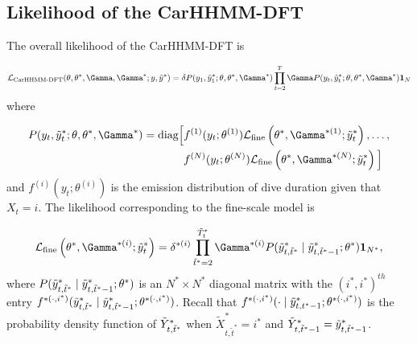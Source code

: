 
\subsection{Likelihood of the CarHHMM-DFT}

The overall likelihood of the CarHHMM-DFT is

\[\calL_{\text{CarHHMM-DFT}}(\theta,\theta^*,\Gamma,\Gamma^*;y,\z) = \delta P(y_1,\z_1;\theta,\theta^*,\Gamma^*) \prod_{t=2}^T \Gamma P(y_t,\z_t;\theta,\theta^*,\Gamma^*) \mathbf{1}_N\]
%
where

\begin{align*}
P(y_t,\z_t;\theta,\theta^*,\Gamma^*)  = \text{diag}\Big[&f^{(1)}(y_t;\theta^{(1)})\calL_{\text{fine}}\left(\theta^*,\Gamma^{*(1)};\z_t\right), \ldots , \\
&f^{(N)}(y_t;\theta^{(N)})\calL_{\text{fine}}\left(\theta^*,\Gamma^{*(N)};\z_t\right) \Big]
\end{align*}
%
and $f^{(i)}(y_t;\theta^{(i)})$ is the emission distribution of dive duration given that $X_t = i$. The likelihood corresponding to the fine-scale model is

\[\calL_{\text{fine}}\left(\theta^{*},\Gamma^{*(i)};\z_t\right) = \delta^{*(i)} \prod_{\tilde t^* = 2}^{\tilde T^*_t} \Gamma^{*(i)} P(\z_{t,\tilde t^*} \mid \z_{t,\tilde t^*-1};\theta^*) \mathbf{1}_{N^*},\]
%
where $P(\tilde{y}^*_{t,\tilde t^*}\mid\tilde{y}^*_{t,\tilde t^*-1};\theta^*)$ is an $N^* \times N^*$ diagonal matrix with the $(i^*,i^*)^{th}$ entry $f^{*(\cdot,i^*)}(\tilde{y}^*_{t,\tilde t^*}\mid\tilde{y}^*_{t,\tilde t^*-1}; \theta^{*(\cdot,i^*)})$.
%
Recall that $f^{*(\cdot,i^*)}(\cdot \mid \tilde{y}^*_{t,t^*-1}; \theta^{*(\cdot,i^*)})$ is the probability density function of $\tilde{Y}^*_{t,\tilde t^*}$ when $\tilde X^*_{t,\tilde t^*} = i^*$ and $\tilde{Y}^*_{t,\tilde t^*-1} = \tilde{y}^*_{t,\tilde t^*-1}$.


